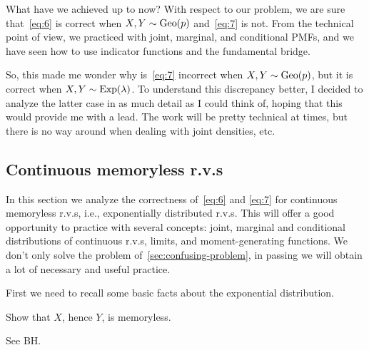 \documentclass[a4paper,12pt]{article}
\begin{document}
What have we achieved up to now? With respect to our problem, we are sure that~\eqref{eq:6} is correct when $X, Y \sim \mathrm{Geo}(p)$ and~\cref{eq:7} is not.
From the technical point of view, we practiced with joint, marginal, and conditional PMFs, and we have seen how to use indicator functions and the fundamental bridge.

So, this made me wonder why is~\eqref{eq:7} incorrect when $X, Y\sim\mathrm{Geo}(p)$, but it is correct when $X,Y\sim\mathrm{Exp}(\lambda)$.
To understand this discrepancy better, I decided to analyze the latter case in as much detail as I could think of, hoping that this would  provide me with a lead.
The work will be pretty technical at times, but there is no way around when dealing with joint densities, etc.



\subsection{Continuous memoryless r.v.s}
\label{sec:exerc-expon-distr}

In this section we analyze the correctness of~\cref{eq:6} and \cref{eq:7} for continuous memoryless r.v.s, i.e., exponentially distributed r.v.s.
This will offer a good opportunity to practice with several concepts: joint, marginal and conditional distributions of continuous r.v.s,  limits, and moment-generating functions.
We don't only solve the problem of~\cref{sec:confusing-problem}, in passing we will obtain a lot of necessary and useful practice.

First we need to recall some basic facts about the exponential distribution.

\begin{exercise}
Show that $X$, hence $Y$, is memoryless.
\begin{solution}
  See BH.
\end{solution}
\end{exercise}
\end{document}

